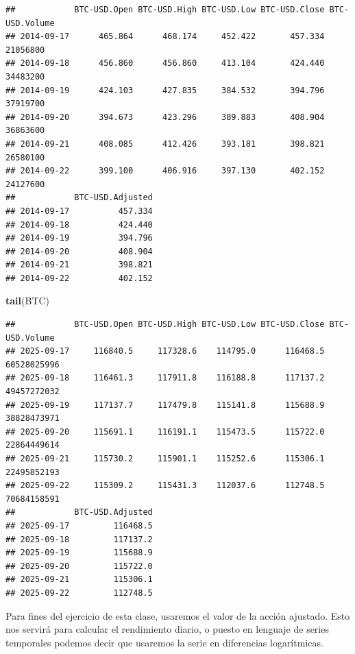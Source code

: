 \documentclass[
]{book}
\newenvironment{Shaded}{\begin{snugshade}}{\end{snugshade}}
\newcommand{\AttributeTok}[1]{\textcolor[rgb]{0.13,0.29,0.53}{#1}}
\newcommand{\FunctionTok}[1]{\textcolor[rgb]{0.13,0.29,0.53}{\textbf{#1}}}
\newcommand{\NormalTok}[1]{#1}
\newcommand{\SpecialCharTok}[1]{\textcolor[rgb]{0.81,0.36,0.00}{\textbf{#1}}}
\newcommand{\StringTok}[1]{\textcolor[rgb]{0.31,0.60,0.02}{#1}}
\begin{document}
\begin{verbatim}
##            BTC-USD.Open BTC-USD.High BTC-USD.Low BTC-USD.Close BTC-USD.Volume
## 2014-09-17      465.864      468.174     452.422       457.334       21056800
## 2014-09-18      456.860      456.860     413.104       424.440       34483200
## 2014-09-19      424.103      427.835     384.532       394.796       37919700
## 2014-09-20      394.673      423.296     389.883       408.904       36863600
## 2014-09-21      408.085      412.426     393.181       398.821       26580100
## 2014-09-22      399.100      406.916     397.130       402.152       24127600
##            BTC-USD.Adjusted
## 2014-09-17          457.334
## 2014-09-18          424.440
## 2014-09-19          394.796
## 2014-09-20          408.904
## 2014-09-21          398.821
## 2014-09-22          402.152
\end{verbatim}

\begin{Shaded}
\begin{Highlighting}[]
\FunctionTok{tail}\NormalTok{(BTC)}
\end{Highlighting}
\end{Shaded}

\begin{verbatim}
##            BTC-USD.Open BTC-USD.High BTC-USD.Low BTC-USD.Close BTC-USD.Volume
## 2025-09-17     116840.5     117328.6    114795.0      116468.5    60528025996
## 2025-09-18     116461.3     117911.8    116188.8      117137.2    49457272032
## 2025-09-19     117137.7     117479.8    115141.8      115688.9    38828473971
## 2025-09-20     115691.1     116191.1    115473.5      115722.0    22864449614
## 2025-09-21     115730.2     115901.1    115252.6      115306.1    22495852193
## 2025-09-22     115309.2     115431.3    112037.6      112748.5    70684158591
##            BTC-USD.Adjusted
## 2025-09-17         116468.5
## 2025-09-18         117137.2
## 2025-09-19         115688.9
## 2025-09-20         115722.0
## 2025-09-21         115306.1
## 2025-09-22         112748.5
\end{verbatim}

Para fines del ejercicio de esta clase, usaremos el valor de la acción ajustado. Esto nos servirá para calcular el rendimiento diario, o puesto en lenguaje de series temporales podemos decir que usaremos la serie en diferencias logarítmicas.

\begin{Shaded}
\end{Shaded}
\end{document}

